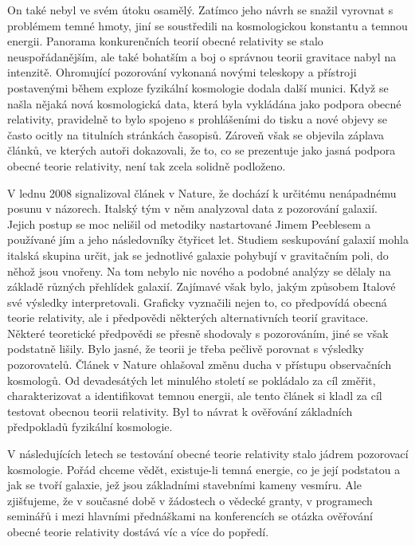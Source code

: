   On také nebyl ve svém útoku osamělý. Zatímco jeho návrh se snažil vyrovnat s problémem temné
  hmoty, jiní se soustředili na kosmologickou konstantu a temnou energii. Panorama konkurenčních
  teorií obecné relativity se stalo neuspořádanějším, ale také bohatším a boj o správnou teorii
  gravitace nabyl na intenzitě. Ohromující pozorování vykonaná novými teleskopy a přístroji
  postavenými během exploze fyzikální kosmologie dodala další munici. Když se našla nějaká nová
  kosmologická data, která byla vykládána jako podpora obecné relativity, pravidelně to bylo spojeno
  s prohlášeními do tisku a nové objevy se často ocitly na titulních stránkách časopisů. Zároveň
  však se objevila záplava článků, ve kterých autoři dokazovali, že to, co se prezentuje jako jasná
  podpora obecné teorie relativity, není tak zcela solidně podloženo. 
  
  V lednu 2008 signalizoval článek v Nature, že dochází k určitému nenápadnému posunu v názorech.
  Italský tým v něm analyzoval data z pozorování galaxií. Jejich postup se moc nelišil od metodiky
  nastartované Jimem Peeblesem a používané jím a jeho následovníky čtyřicet let. Studiem seskupování
  galaxií mohla italská skupina určit, jak se jednotlivé galaxie pohybují v gravitačním poli, do
  něhož jsou vnořeny. Na tom nebylo nic nového a podobné analýzy se dělaly na základě různých
  přehlídek galaxií. Zajímavé však bylo, jakým způsobem Italové své výsledky interpretovali.
  Graficky vyznačili nejen to, co předpovídá obecná teorie relativity, ale i předpovědi některých
  alternativních teorií gravitace. Některé teoretické předpovědi se přesně shodovaly s pozorováním,
  jiné se však podstatně lišily. Bylo jasné, že teorii je třeba pečlivě porovnat s výsledky
  pozorovatelů. Článek v Nature ohlašoval změnu ducha v přístupu observačních kosmologů. Od
  devadesátých let minulého století se pokládalo za cíl změřit, charakterizovat a identifikovat
  temnou energii, ale tento článek si kladl za cíl testovat obecnou teorii relativity. Byl to návrat
  k ověřování základních předpokladů fyzikální kosmologie. 
  
  V následujících letech se testování obecné teorie relativity stalo jádrem pozorovací kosmologie.
  Pořád chceme vědět, existuje-li temná energie, co je její podstatou a jak se tvoří galaxie, jež
  jsou základními stavebními kameny vesmíru. Ale zjišťujeme, že v současné době v žádostech o
  vědecké granty, v programech seminářů i mezi hlavními přednáškami na konferencích se otázka
  ověřování obecné teorie relativity dostává víc a více do popředí. 
  
